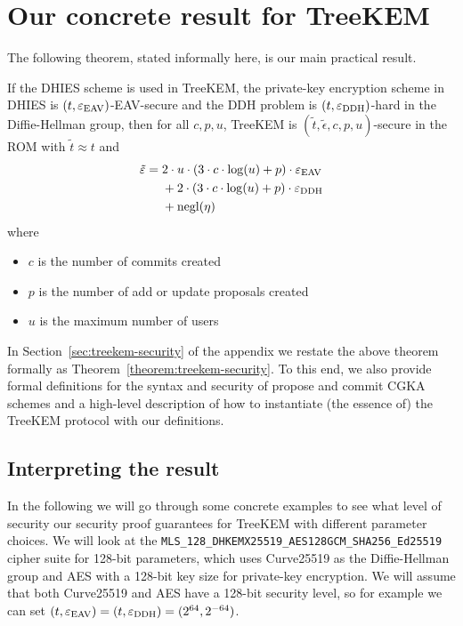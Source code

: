 \section{Our concrete result for TreeKEM}

The following theorem, stated informally here, is our main practical result.

\begin{theorem}[Informal] \label{theorem:treekem-security-informal}
	If the DHIES scheme is used in TreeKEM, the private-key encryption scheme in DHIES is $(t, \varepsilon_\mathrm{EAV})$-EAV-secure and the DDH problem is $(t, \varepsilon_\mathrm{DDH})$-hard in the Diffie-Hellman group, then for all $c, p, u$, TreeKEM is $(\tilde{t}, \tilde{\epsilon}, c, p, u)$-secure in the ROM with $\tilde{t} \approx t$ and
	\begin{align*}
		\begin{split}
			\tilde{\varepsilon} ={} & 2 \cdot u \cdot (3 \cdot c \cdot \log(u) + p) \cdot \varepsilon_\mathrm{EAV} \\
			& + 2 \cdot (3 \cdot c \cdot \log(u) + p) \cdot \varepsilon_\mathrm{DDH} \\
			& + \mathrm{negl}(\eta)
		\end{split}
	\end{align*}
	where
	\begin{itemize}
		\item $c$ is the number of commits created
		\item $p$ is the number of add or update proposals created
		\item $u$ is the maximum number of users
	\end{itemize}
\end{theorem}

In Section~\ref{sec:treekem-security} of the appendix we restate the above theorem formally as Theorem~\ref{theorem:treekem-security}. To this end, we also provide formal definitions for the syntax and security of propose and commit CGKA schemes and a high-level description of how to instantiate (the essence of) the TreeKEM protocol with our definitions.

\subsection{Interpreting the result}

In the following we will go through some concrete examples to see what level of security our security proof guarantees for TreeKEM with different parameter choices. We will look at the \texttt{MLS\_128\_DHKEMX25519\_AES128GCM\_SHA256\_Ed25519} cipher suite \cite[Section~17.1]{rfc9420} for 128-bit parameters, which uses Curve25519 as the Diffie-Hellman group and AES with a 128-bit key size for private-key encryption. We will assume that both Curve25519 and AES have a 128-bit security level, so for example we can set $(t, \varepsilon_\mathrm{EAV}) = (t, \varepsilon_\mathrm{DDH}) = (2^{64}, 2^{-64})$.

